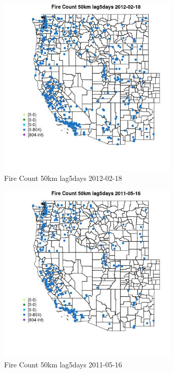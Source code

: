 \begin{figure} 
\centering  
\includegraphics[width=0.77\textwidth]{Code_Outputs/Report_ML_input_PM25_Step4_part_f_de_duplicated_aveswNAs_MapObsFire_Count_50km_lag5days2012-02-18.jpg} 
\caption{\label{fig:Report_ML_input_PM25_Step4_part_f_de_duplicated_aveswNAsMapObsFire_Count_50km_lag5days2012-02-18}Fire Count 50km lag5days 2012-02-18} 
\end{figure} 
 

\begin{figure} 
\centering  
\includegraphics[width=0.77\textwidth]{Code_Outputs/Report_ML_input_PM25_Step4_part_f_de_duplicated_aveswNAs_MapObsFire_Count_50km_lag5days2011-05-16.jpg} 
\caption{\label{fig:Report_ML_input_PM25_Step4_part_f_de_duplicated_aveswNAsMapObsFire_Count_50km_lag5days2011-05-16}Fire Count 50km lag5days 2011-05-16} 
\end{figure} 
 

